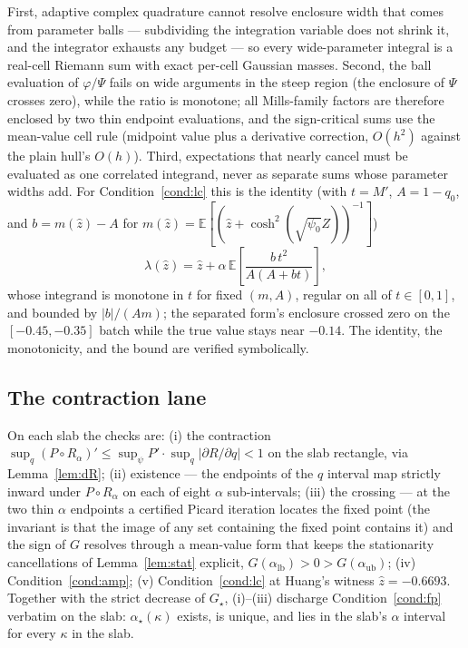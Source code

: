 \documentclass[11pt]{article}
\theoremstyle{remark}
\newcommand{\E}{\mathbb{E}}
\begin{document}
First, adaptive complex quadrature cannot resolve enclosure width
that comes from parameter balls --- subdividing the integration
variable does not shrink it, and the integrator exhausts any budget
--- so every wide-parameter integral is a real-cell Riemann sum with
exact per-cell Gaussian masses.  Second, the ball evaluation of
$\varphi/\Psi$ fails on wide arguments in the steep region (the
enclosure of $\Psi$ crosses zero), while the ratio is monotone; all
Mills-family factors are therefore enclosed by two thin endpoint
evaluations, and the sign-critical sums use the mean-value cell rule
(midpoint value plus a derivative correction, $O(h^2)$ against the
plain hull's $O(h)$).  Third, expectations that nearly cancel must be
evaluated as one correlated integrand, never as separate sums whose
parameter widths add.  For Condition~\ref{cond:lc} this is the
identity (with $t=M'$, $A=1-q_0$, and $b=m(\hat z)-A$ for
$m(\hat z)=\E[(\hat z+\cosh^2(\sqrt{\psi_0}Z))^{-1}]$)
\[
\lambda(\hat z)=\hat z+\alpha\,\E\!\left[\frac{b\,t^2}{A(A+bt)}\right],
\]
whose integrand is monotone in $t$ for fixed $(m,A)$, regular on all
of $t\in[0,1]$, and bounded by $|b|/(Am)$; the separated form's
enclosure crossed zero on the $[-0.45,-0.35]$ batch while the true
value stays near $-0.14$.  The identity, the monotonicity, and the
bound are verified symbolically.

\subsection{The contraction lane}

On each slab the checks are: (i) the contraction
$\sup_q(P\circ R_\alpha)'\le\sup_\psi P'\cdot\sup_q|\partial R/
\partial q|<1$ on the slab rectangle, via Lemma~\ref{lem:dR}; (ii)
existence --- the endpoints of the $q$ interval map strictly inward
under $P\circ R_\alpha$ on each of eight $\alpha$ sub-intervals;
(iii) the crossing --- at the two thin $\alpha$ endpoints a certified
Picard iteration locates the fixed point (the invariant is that the
image of any set containing the fixed point contains it) and the sign
of $G$ resolves through a mean-value form that keeps the stationarity
cancellations of Lemma~\ref{lem:stat} explicit,
$G(\alpha_{\mathrm{lb}})>0>G(\alpha_{\mathrm{ub}})$; (iv)
Condition~\ref{cond:amp}; (v) Condition~\ref{cond:lc} at Huang's
witness $\hat z=-0.6693$.  Together with the strict decrease of
$G_\star$, (i)--(iii) discharge Condition~\ref{cond:fp} verbatim on
the slab: $\alpha_\star(\kappa)$ exists, is unique, and lies in the
slab's $\alpha$ interval for every $\kappa$ in the slab.
\end{document}
